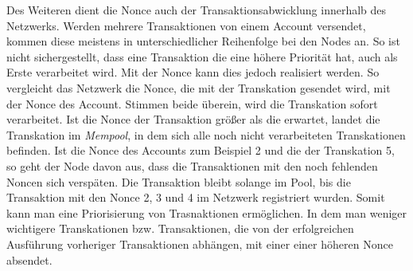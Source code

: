 \documentclass[runningheads]{llncs}
\begin{document}

Des Weiteren dient die Nonce auch der Transaktionsabwicklung innerhalb des Netzwerks.  Werden mehrere Transaktionen von einem Account versendet, kommen diese meistens in unterschiedlicher Reihenfolge bei den Nodes an. So ist nicht sichergestellt, dass eine Transaktion die eine höhere Priorität hat, auch als Erste verarbeitet wird. Mit der Nonce kann dies jedoch realisiert werden. So vergleicht das Netzwerk die Nonce, die mit der Transkation gesendet wird, mit der Nonce des Account. Stimmen beide überein, wird die Transkation sofort verarbeitet. Ist die Nonce der Transaktion größer als die erwartet, landet die Transkation im \textit{Mempool}, in dem sich alle noch nicht verarbeiteten Transkationen befinden. Ist die Nonce des Accounts zum Beispiel 2 und die der Transkation 5, so geht der Node davon aus, dass die Transaktionen mit den noch fehlenden Noncen sich verspäten. Die Transaktion bleibt solange im Pool, bis die Transaktion mit den Nonce 2, 3 und 4 im Netzwerk registriert wurden. Somit kann man eine Priorisierung von Trasnaktionen ermöglichen. In dem man weniger wichtigere Transkationen bzw. Transaktionen, die von der erfolgreichen Ausführung vorheriger Transaktionen abhängen, mit einer einer höheren Nonce absendet.
\end{document}
